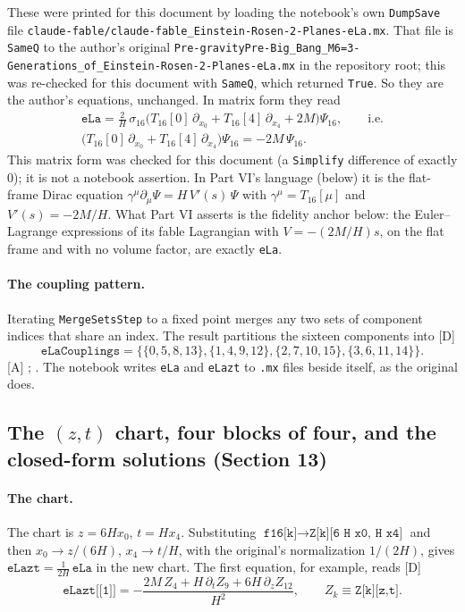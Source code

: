 These were printed for this document by loading the notebook's own \texttt{DumpSave} file
\texttt{claude-fable/claude-fable\_Einstein-Rosen-2-Planes-eLa.mx}. That file is \texttt{SameQ} to
the author's original
\texttt{Pre-gravityPre-Big\_Bang\_M6=3-\allowbreak Generations\_of\_\allowbreak Einstein-Rosen-2-Planes-eLa.mx} in the
repository root; this was re-checked for this document with \texttt{SameQ}, which returned
\texttt{True}. So they are the author's equations, unchanged. In matrix form they read
\begin{gather}
  \texttt{eLa} = \frac2H\,\sigma_{16}\bigl(T_{16}[0]\,\partial_{x_0}+T_{16}[4]\,\partial_{x_4}+2M\bigr)\Psi_{16},
  \qquad\text{i.e.}\\
  \bigl(T_{16}[0]\,\partial_{x_0}+T_{16}[4]\,\partial_{x_4}\bigr)\Psi_{16} = -2M\,\Psi_{16}.
\end{gather}
This matrix form was checked for this document (a \texttt{Simplify} difference of exactly 0); it
is not a notebook assertion. In Part VI's language (below) it is the flat-frame Dirac equation
$\gamma^\mu\partial_\mu\Psi = H\,V'(s)\,\Psi$ with $\gamma^\mu=T_{16}[\mu]$ and $V'(s)=-2M/H$. What
Part VI asserts is the fidelity anchor below: the Euler--Lagrange expressions of its fable
Lagrangian with $V=-(2M/H)s$, on the flat frame and with no volume factor, are exactly
\texttt{eLa}.

\paragraph{The coupling pattern.} Iterating \texttt{MergeSetsStep} to a fixed point merges any
two sets of component indices that share an index. The result partitions the sixteen components
into [D]
\begin{equation}
  \texttt{eLaCouplings} = \{\{0,5,8,13\},\{1,4,9,12\},\{2,7,10,15\},\{3,6,11,14\}\}.
\end{equation}
[A] ;
. The notebook writes \texttt{eLa} and \texttt{eLazt} to
\texttt{.mx} files beside itself, as the original does.

\subsection{The \texorpdfstring{$(z,t)$}{(z,t)} chart, four blocks of four, and the closed-form solutions (Section 13)}
\label{fnd:zt}\label{sec:2.9}

\paragraph{The chart.} The chart is $z=6Hx_0$, $t=Hx_4$. Substituting
$\texttt{f16[k]}\to\texttt{Z[k][6 H x0, H x4]}$ and then $x_0\to z/(6H)$, $x_4\to t/H$, with
the original's normalization $1/(2H)$, gives $\texttt{eLazt}=\tfrac{1}{2H}\,\texttt{eLa}$ in the
new chart. The first equation, for example, reads [D]
\begin{equation}
  \texttt{eLazt[[1]]} = -\frac{2M\,Z_4 + H\,\partial_t Z_9 + 6H\,\partial_z Z_{12}}{H^2},
  \qquad Z_k\equiv\texttt{Z[k][z,t]}.
\end{equation}

